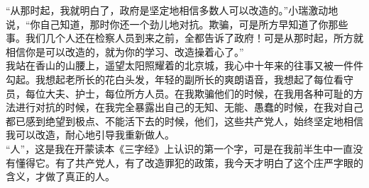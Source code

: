 “从那时起，我就明白了，政府是坚定地相信多数人可以改造的。”小瑞激动地说，“你自己知道，那时你还一个劲儿地对抗。欺骗，可是所方早知道了你那些事。我们几个人还在检察人员到来之前，全都告诉了政府！可是从那时起，所方就相信你是可以改造的，就为你的学习、改造操着心了。”\\

我站在香山的山腰上，遥望太阳照耀着的北京城，我心中十年来的往事又被一件件勾起。我想起老所长的花白头发，年轻的副所长的爽朗语音，我想起了每位看守员，每位大夫、护士，每位所方人员。在我欺骗他们的时候，在我用各种可耻的方法进行对抗的时候，在我完全暴露出自己的无知、无能、愚蠢的时候，在我对自己都已感到绝望到极点、不能活下去的时候，他们，这些共产党人，始终坚定地相信我可以改造，耐心地引导我重新做人。\\

“人”，这是我在开蒙读本《三字经》上认识的第一个字，可是在我前半生中一直没有懂得它。有了共产党人，有了改造罪犯的政策，我今天才明白了这个庄严字眼的含义，才做了真正的人。\\